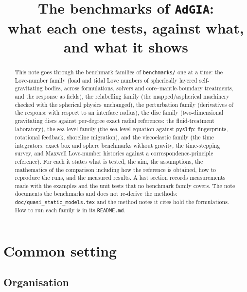 \documentclass[11pt]{article}
\title{The benchmarks of \texttt{AdGIA}:\\
       what each one tests, against what, and what it shows}
\author{}
\date{}
\numberwithin{equation}{section}
\newcommand{\code}[1]{\texttt{#1}}
\begin{document}
\maketitle

\begin{abstract}
\noindent
This note goes through the benchmark families of \code{benchmarks/} one at
a time: the Love-number family (load and tidal Love numbers of spherically
layered self-gravitating bodies, across formulations, solvers and
core--mantle-boundary treatments, and the response as fields), the
relabelling family (the mapped/aspherical machinery checked with
the spherical physics unchanged), the perturbation family (derivatives of
the response with respect to an interface radius), the disc family
(two-dimensional gravitating discs against per-degree exact radial
references: the fluid-treatment laboratory), the sea-level family (the
sea-level equation against \code{pyslfp}: fingerprints, rotational
feedback, shoreline migration), and the viscoelastic
family (the time integrators: exact box and sphere benchmarks without
gravity, the time-stepping survey, and Maxwell Love-number histories
against a correspondence-principle reference). For each it states what is
tested, the aim, the assumptions, the mathematics of the comparison
including how the reference is obtained, how to reproduce the runs, and the
measured results. A last section records measurements made with the
examples and the unit tests that no benchmark family covers. The note
documents the benchmarks and does not re-derive the methods:
\code{doc/quasi\_static\_models.tex} and the method notes it cites hold the
formulations. How to run each family is in its \code{README.md}.
\end{abstract}

\tableofcontents

\section{Common setting}
\label{sec:common}

\subsection{Organisation}
\label{sec:organisation}
\end{document}
